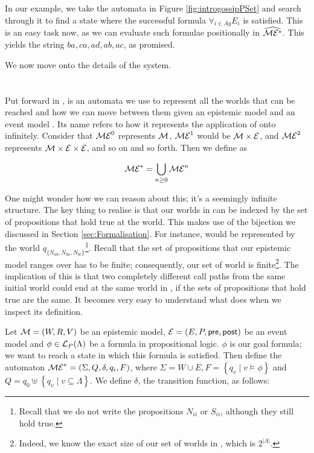 \documentclass[10pt, a4paper]{report}
\begin{document}
In our example, we take the automata in Figure \ref{fig:introgossipPSet} and
search through it to find a state where the successful formula $\forall_{i \in
  Ag} E_i$ is satisfied. This is an easy task now, as we can evaluate such
formulae positionally in $\widehat{\mathcal{ME^\ast}}$. This yields the string $ba, ca,
ad, ab, ac$, as promised.

We now move onto the details of the system.

\section{\mestar}
\label{sec:mestar}

Put forward in \cite{AutomataTechniques}, \mestar is an automata we use to
represent all the worlds that can be reached and how we can move between them
given an epistemic model  and an event model . Its name refers to
how it represents the application of  onto  infinitely. Consider
that $\mathcal{ME}^0$ represents $\mathcal{M}$, $\mathcal{ME}^1$ would be $\mathcal{M} \times
\mathcal{E}$, and $\mathcal{ME}^2$ represents $\mathcal{M} \times \mathcal{E} \times \mathcal{E}$, and so
on and so forth. Then we define \mestar as

\begin{equation*}
  \mathcal{ME}^\ast = \bigcup_{n \geq 0} \mathcal{ME}^n
\end{equation*}

One might wonder how we can reason about this; it's a seemingly infinite
structure. The key thing to realise is that our worlds in \mestar can be indexed
by the set of propositions that hold true at the world. This makes use of the
bijection we discussed in Section \ref{sec:Formalisation}. For instance,
 would be represented by the world $q_{\{N_{ab},
  N_{ba}, N_{bc}\}}$\footnote{Recall that we do not write the propositions $N_{ii}$
  or $S_{ii}$, although they still hold true.}. Recall that the set of propositions
that our epistemic model ranges over has to be finite; consequently, our set of
world is finite\footnote{Indeed, we know the exact size of our set of worlds in
  \mestar, which is $2^{|\Lambda|}$.}. The implication of this is that two
completely different call paths from the same initial world could end at the
same world in \mestar, if the sets of propositions that hold true are the same.
It becomes very easy to understand what \mestar does when we inspect its
definition.

Let $\mathcal{M} = (W, R, V)$ be an epistemic model, $\mathcal{E} = (E, P, \textsf{pre},
\textsf{post})$ be an event model and $\phi \in \mathcal{L}_P(\Lambda)$ be a formula in
propositional logic. $\phi$ is our goal formula; we want to reach a state in
which this formula is satisfied. Then define the automaton $\mathcal{ME}^\ast=
(\Sigma, Q, \delta, q_i, F)$, where $\Sigma = W \cup E, F = \left\{ q_v \mid v
  \models \phi \right\}$ and $Q = q_0 \uplus \left\{ q_v \mid v \subseteq
  \Lambda \right\}$. We define $\delta$, the transition function, as follows:
\end{document}
